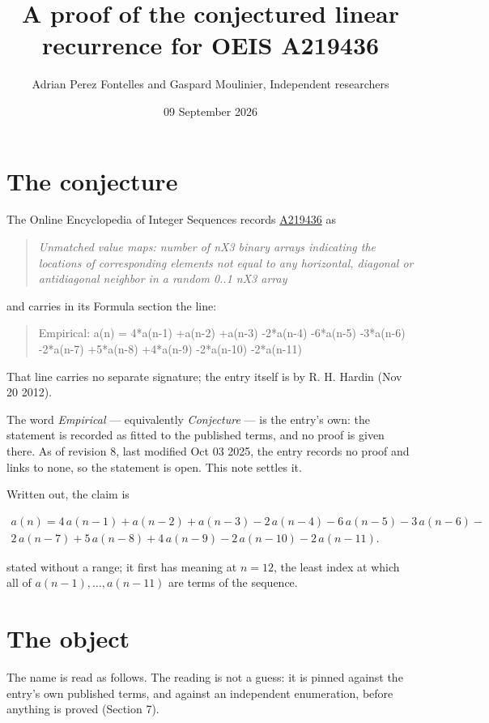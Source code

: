 \documentclass[11pt]{article}
\title{A proof of the conjectured linear recurrence for OEIS A219436}
\author{Adrian Perez Fontelles and Gaspard Moulinier, Independent researchers}
\date{09 September 2026}
\theoremstyle{definition}
\begin{document}
\maketitle
\section{The conjecture}

The Online Encyclopedia of Integer Sequences records \href{https://oeis.org/A219436}{A219436} as

\begin{quote}\itshape Unmatched value maps: number of nX3 binary arrays indicating the locations of corresponding elements not equal to any horizontal, diagonal or antidiagonal neighbor in a random 0..1 nX3 array\end{quote}

and carries in its Formula section the line:

\begin{quote}\ttfamily Empirical: a(n) = 4*a(n-1) +a(n-2) +a(n-3) -2*a(n-4) -6*a(n-5) -3*a(n-6) -2*a(n-7) +5*a(n-8) +4*a(n-9) -2*a(n-10) -2*a(n-11)\end{quote}

That line carries no separate signature; the entry itself is by R. H. Hardin (Nov 20 2012).

The word {\itshape Empirical} --- equivalently {\itshape Conjecture} --- is the entry's own: the statement is recorded as fitted to the published terms, and no proof is given there. As of revision 8, last modified Oct 03 2025, the entry records no proof and links to none, so the statement is open. This note settles it.

Written out, the claim is

\begin{multline*} a(n) = 4\,a(n-1) + a(n-2) + a(n-3) - 2\,a(n-4) - 6\,a(n-5) - 3\,a(n-6) - \\ 2\,a(n-7) + 5\,a(n-8) + 4\,a(n-9) - 2\,a(n-10) - 2\,a(n-11). \end{multline*}

stated without a range; it first has meaning at $n = 12$, the least index at which all of $a(n-1),\dots,a(n-11)$ are terms of the sequence.

\section{The object}

The name is read as follows. The reading is not a guess: it is pinned against the entry's own published terms, and against an independent enumeration, before anything is proved (Section 7).
\end{document}
